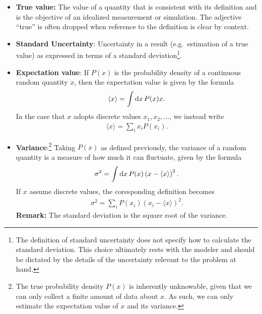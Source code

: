 \begin{itemize}
\item {\bf True value:}  The value of a quantity that is consistent with its definition and is the objective of an idealized measurement or simulation. The adjective ``true'' is often dropped when reference to the definition is clear by context\citep{JCGM:GUM2008,JCGM:VIM2012}.
  \label{def:true_value}




\item {\bf Standard Uncertainty}: Uncertainty in a result (e.g.\ estimation of a true value) as expressed in terms of a standard deviation\footnote{The definition of standard uncertainty does not specify how to calculate the standard deviation.
    This choice ultimately rests with the modeler and should be dictated by the details of the uncertainty relevant to the problem at hand.}.
  \label{def:std_unc}


\item {\bf Expectation value}:  If $P(x)$ is the probability density of a continuous random quantity $x$, then the expectation value is given by the formula
\begin{align}
  \langle x \rangle = \int {\rm d}x\, P(x) x.
\end{align}
In the case that $x$ adopts discrete values $x_1,x_2,...$, we instead write
\begin{align}
\langle x \rangle = \sum_i x_i P(x_i).
\end{align}

\item {\bf Variance}:\footnote{The true probability density $P(x)$ is inherently unknowable, given that we can only collect a finite amount of data about $x$.  As such, we can only estimate the expectation value of $x$ and its variance.} Taking $P(x)$ as defined previously, the variance of a random quantity is a measure of how much it can fluctuate, given by the formula
\begin{align}
\sigma^2 = \int {\rm d}x\, P(x) \left( x  - \langle x \rangle \right)^2.
\end{align}
If $x$ assume discrete values, the coresponding definition becomes
\begin{align}
\sigma^2 = \sum_i P(x_i) \left( x_i  - \langle x \rangle \right)^2.
\end{align}
{\bf Remark:} The standard deviation is the square root of the variance.


\end{itemize}
